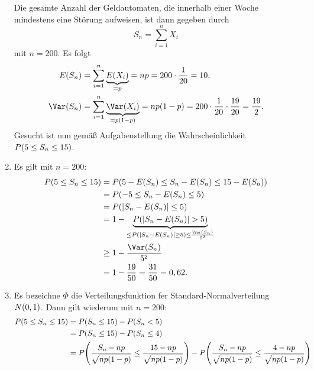 \documentclass{exercise}
\begin{document}
\begin{enumerate}
        Die gesamte Anzahl der Geldautomaten, die innerhalb einer Woche mindestens eine Störung aufweisen, ist dann gegeben durch
        \[
            S_n = \sum_{i = 1}^n X_i
        \]
        mit \(n = 200\).
        Es folgt
        \begin{align*}
            E\parentheses*{S_n} &= \sum_{i = 1}^n \underbrace{E\parentheses*{X_i}}_{= p} = np = 200 \cdot \frac{1}{20} = 10,\\
            \Var\parentheses*{S_n} &= \sum_{i = 1}^n \underbrace{\Var\parentheses*{X_i}}_{= p\parentheses*{1 - p}} = np\parentheses*{1 - p} = 200 \cdot \frac{1}{20} \cdot \frac{19}{20} = \frac{19}{2}.
        \end{align*}
        Gesucht ist nun gemäß Aufgabenstellung die Wahrscheinlichkeit \(P\parentheses*{5 \le S_n \le 15}\).
        \item Es gilt mit \(n = 200\):
        \begin{align*}
            P\parentheses*{5 \le S_n \le 15} &= P\parentheses*{5 - E\parentheses*{S_n} \le S_n - E\parentheses*{S_n} \le 15 - E\parentheses*{S_n}}\\
            &= P\parentheses*{-5 \le S_n - E\parentheses*{S_n} \le 5}\\
            &= P\parentheses*{\absolute*{S_n - E\parentheses*{S_n}} \le 5}\\
            &= 1 - \underbrace{P\parentheses*{\absolute*{S_n - E\parentheses*{S_n}} > 5}}_{\le P\parentheses*{\absolute*{S_n - E\parentheses*{S_n}} \ge 5} \le \frac{\Var\parentheses*{S_n}}{5^2}}\\
            &\ge 1 - \frac{\Var\parentheses*{S_n}}{5^2}\\
            &= 1 - \frac{19}{50} = \frac{31}{50} = 0,62.
        \end{align*}
        \item Es bezeichne \(\Phi\) die Verteilungsfunktion fer Standard-Normalverteilung \(N\parentheses*{0, 1}\).
        Dann gilt wiederum mit \(n = 200\):
        \begin{align*}
            P\parentheses*{5 \le S_n \le 15} &= P\parentheses*{S_n \le 15} - P\parentheses*{S_n < 5}\\
            &= P\parentheses*{S_n \le 15} - P\parentheses*{S_n \le 4}\\
            &= P\parentheses*{\frac{S_n - np}{\sqrt{np\parentheses*{1 - p}}} \le \frac{15 - np}{\sqrt{np\parentheses*{1 - p}}}} - P\parentheses*{\frac{S_n - np}{\sqrt{np\parentheses*{1 - p}}} \le \frac{4 - np}{\sqrt{np\parentheses*{1 - p}}}}\\

\end{align*}
\end{enumerate}
\end{document}

